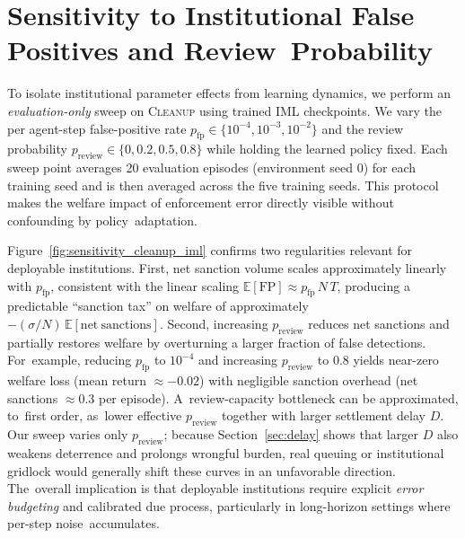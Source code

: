 \documentclass[mca,article,accept,pdftex,oneauthor]{Definitions/mdpi}
\begin{document}
\section{Sensitivity to Institutional False Positives and Review~Probability}
\label{app:sensitivity}

To isolate institutional parameter effects from learning dynamics, we perform an \emph{evaluation-only} sweep on \textsc{Cleanup} using trained IML checkpoints. We vary the per agent-step false-positive rate $p_{\mathrm{fp}}\in\{10^{-4},10^{-3},10^{-2}\}$ and the review probability \mbox{$p_{\mathrm{review}}\in\{0,0.2,0.5,0.8\}$} while holding the learned policy fixed. Each sweep point averages 20 evaluation episodes (environment seed 0) for each training seed and is then averaged across the five training seeds. This protocol makes the welfare impact of enforcement error directly visible without confounding by policy~adaptation.

Figure~\ref{fig:sensitivity_cleanup_iml} confirms two regularities relevant for deployable institutions. First, net sanction volume scales approximately linearly with $p_{\mathrm{fp}}$, consistent with the linear scaling $\mathbb{E}[\mathrm{FP}] \approx p_{\mathrm{fp}} \, N \, T$, producing a predictable ``sanction tax'' on welfare of approximately $-(\sigma/N)\,\mathbb{E}[\mathrm{net\ sanctions}]$. Second, increasing $p_{\mathrm{review}}$ reduces net sanctions and partially restores welfare by overturning a larger fraction of false detections. For~example, reducing $p_{\mathrm{fp}}$ to $10^{-4}$ and increasing $p_{\mathrm{review}}$ to 0.8 yields near-zero welfare loss (mean return $\approx -0.02$) with negligible sanction overhead (net sanctions $\approx 0.3$ per episode). A~review-capacity bottleneck can be approximated, to~first order, as~lower effective $p_{\mathrm{review}}$ together with larger settlement delay $D$. Our sweep varies only $p_{\mathrm{review}}$; because Section~\ref{sec:delay} shows that larger $D$ also weakens deterrence and prolongs wrongful burden, real queuing or institutional gridlock would generally shift these curves in an unfavorable direction. The~overall implication is that deployable institutions require explicit \emph{error budgeting} and calibrated due process, particularly in long-horizon settings where per-step noise~accumulates.
\end{document}
